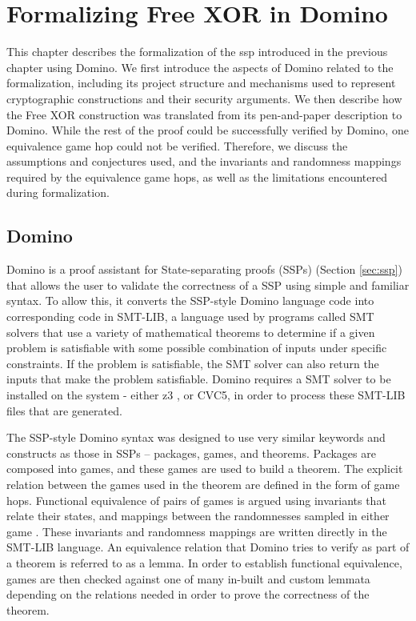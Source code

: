\newcommand{\code}[1]{%
  \texttt{\color{black!80}{#1}}%
}
\chapter{Formalizing Free XOR in Domino}
\label{chp:domino}
This chapter describes the formalization of the \acrshort{ssp} introduced in the previous chapter using Domino. We first introduce the aspects of Domino related to the formalization, including its project structure and mechanisms used to represent cryptographic constructions and their security arguments. We then describe how the Free XOR construction was translated from its pen-and-paper description to Domino. While the rest of the proof could be successfully verified by Domino, one equivalence game hop could not be verified. Therefore, we discuss the assumptions and conjectures used, and the invariants and randomness mappings required by the equivalence game hops, as well as the limitations encountered during formalization.
\section{Domino}
\label{sec:whatisdomino}
Domino is a proof assistant for State-separating proofs (SSPs) (Section \ref{sec:ssp}) that allows the user to validate the correctness of a SSP using simple and familiar syntax. To allow this, it converts the SSP-style Domino language code into corresponding code in SMT-LIB, a language used by programs called SMT solvers that use a variety of mathematical theorems to determine if a given problem is satisfiable with some possible combination of inputs under specific constraints. If the problem is satisfiable, the SMT solver can also return the inputs that make the problem satisfiable. Domino requires a SMT solver to be installed on the system - either \acrfull{z3} \cite{de_moura_z3_2008}, or CVC5, in order to process these SMT-LIB files that are generated. 

The SSP-style Domino syntax was designed to use very similar keywords and constructs as those in SSPs -- packages, games, and theorems. Packages are composed into games, and these games are used to build a theorem. The explicit relation between the games used in the theorem are defined in the form of game hops. Functional equivalence of pairs of games is argued using invariants that relate their states, and mappings between the randomnesses sampled in either game \cite{domino:paper}. These invariants and randomness mappings are written directly in the SMT-LIB language. An equivalence relation that Domino tries to verify as part of a theorem is referred to as a lemma. In order to establish functional equivalence, games are then checked against one of many in-built and custom lemmata depending on the relations needed in order to prove the correctness of the theorem.

